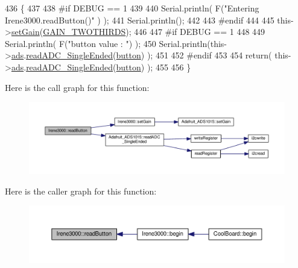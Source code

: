 \begin{DoxyCode}
436 \{
437 
438 \textcolor{preprocessor}{#if DEBUG == 1 }
439 
440     Serial.println( F(\textcolor{stringliteral}{"Entering Irene3000.readButton()"} ) );
441     Serial.println();
442 
443 \textcolor{preprocessor}{#endif }
444 
445     this->\hyperlink{class_irene3000_aff7c5da186b388e7272e63ff88a20c34}{setGain}(\hyperlink{_cool_adafruit___a_d_s1015_8h_a3d6c0e15829a207b9155890811fa4781a879d688347ec0bf159fe1278db602f68}{GAIN\_TWOTHIRDS});
446 
447 \textcolor{preprocessor}{#if DEBUG == 1}
448     
449     Serial.println( F(\textcolor{stringliteral}{"button value : "}) );
450     Serial.println(this->\hyperlink{class_irene3000_a1215e77ba761c9908d80d691f149e135}{ads}.\hyperlink{class_adafruit___a_d_s1015_a40f38b9e1f3ec397c0670dd632510235}{readADC\_SingleEnded}(\hyperlink{_irene3000_8h_a37976ee6fe1fb8546bfd6153b83ffa6c}{button}) );
451 
452 \textcolor{preprocessor}{#endif }
453 
454     \textcolor{keywordflow}{return}( this->\hyperlink{class_irene3000_a1215e77ba761c9908d80d691f149e135}{ads}.\hyperlink{class_adafruit___a_d_s1015_a40f38b9e1f3ec397c0670dd632510235}{readADC\_SingleEnded}(\hyperlink{_irene3000_8h_a37976ee6fe1fb8546bfd6153b83ffa6c}{button}) );
455     
456 \}
\end{DoxyCode}
Here is the call graph for this function\+:\nopagebreak
\begin{figure}[H]
\begin{center}
\leavevmode
\includegraphics[width=350pt]{d6/d03/class_irene3000_a78a87eb7cf295b95c12b2ebd51c2bb77_cgraph}
\end{center}
\end{figure}
Here is the caller graph for this function\+:\nopagebreak
\begin{figure}[H]
\begin{center}
\leavevmode
\includegraphics[width=350pt]{d6/d03/class_irene3000_a78a87eb7cf295b95c12b2ebd51c2bb77_icgraph}
\end{center}
\end{figure}
\mbox{\label{class_irene3000_a436fc0a06681cd0784aba56b9707f19a}} 
